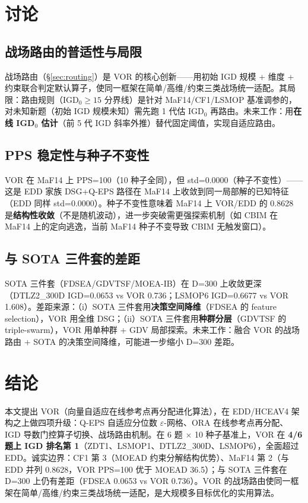\documentclass[a4paper,11pt]{article}
\begin{document}
\section{讨论}
\label{sec:disc}

\subsection{战场路由的普适性与局限}
战场路由（§\ref{sec:routing}）是 VOR 的核心创新——用初始 IGD 规模 + 维度 + 约束联合判定默认算子，使同一框架在简单/高维/约束三类战场统一适配。其局限：路由规则（IGD$_0\geq15$ 分界线）是针对 MaF14/CF1/LSMOP 基准调参的，对未知新题（初始 IGD 规模未知）需先跑 1 代估 IGD$_0$ 再路由。未来工作：用\textbf{在线 IGD$_0$ 估计}（前 5 代 IGD 斜率外推）替代固定阈值，实现自适应路由。

\subsection{PPS 稳定性与种子不变性}
VOR 在 MaF14 上 PPS=100（10 种子全同），但 std=0.0000（种子不变性）——这是 EDD 家族 DSG+Q-EPS 路径在 MaF14 上收敛到同一局部解的已知特征（EDD 同样 std=0.0000）。种子不变性意味着 MaF14 上 VOR/EDD 的 0.8628 是\textbf{结构性收敛}（不是随机波动），进一步突破需更强探索机制（如 CBIM 在 MaF14 上的定向逃逸，当前 MaF14 种子不变导致 CBIM 无触发窗口）。

\subsection{与 SOTA 三件套的差距}
SOTA 三件套（FDSEA/GDVTSF/MOEA-IB）在 D=300 上收敛更深（DTLZ2\_300D IGD=0.0653 vs VOR 0.736；LSMOP6 IGD=0.6677 vs VOR 1.608）。差距来源：（i）SOTA 三件套用\textbf{决策空间降维}（FDSEA 的 feature selection），VOR 用全维 DSG；（ii）SOTA 三件套用\textbf{种群分层}（GDVTSF 的 triple-swarm），VOR 用单种群 + GDV 局部探索。未来工作：融合 VOR 的战场路由 + SOTA 的决策空间降维，可能进一步缩小 D=300 差距。

\section{结论}
\label{sec:conc}
本文提出 VOR（向量自适应在线参考点再分配进化算法），在 EDD/HCEAV4 架构之上做四项升级：Q-EPS 自适应分位数 $\varepsilon$-网格、ORA 在线参考点再分配、IGD 导数门控算子切换、战场路由机制。在 6 题 $\times$ 10 种子基准上，VOR 在 \textbf{4/6 题上 IGD 排名第 1}（ZDT1、LSMOP1、DTLZ2\_300D、LSMOP6），全面超过 EDD。诚实边界：CF1 第 3（MOEAD 约束分解结构优势）、MaF14 第 2（与 EDD 并列 0.8628，VOR PPS=100 优于 MOEAD 36.5）；与 SOTA 三件套在 D=300 上仍有差距（FDSEA 0.0653 vs VOR 0.736）。VOR 的战场路由使同一框架在简单/高维/约束三类战场统一适配，是大规模多目标优化的实用算法。
\end{document}
